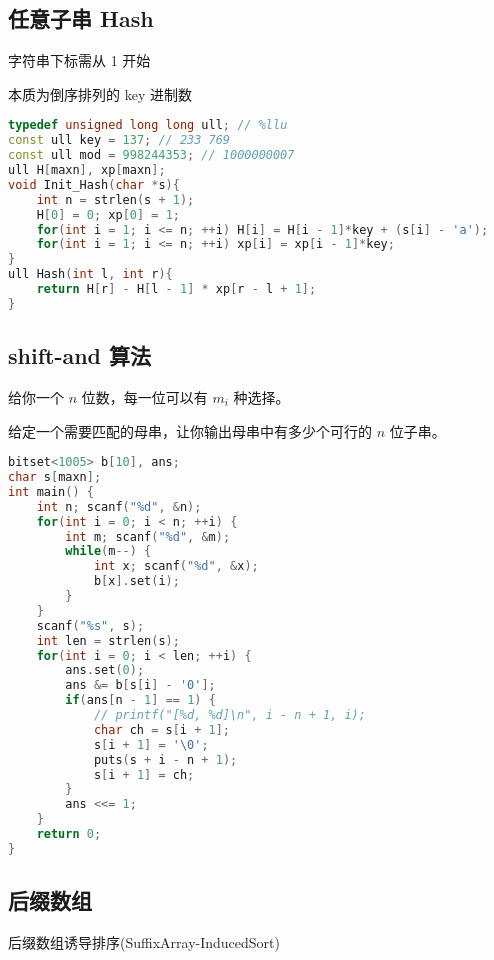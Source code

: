 \subsection{任意子串 Hash}

字符串下标需从 1 开始

本质为倒序排列的 key 进制数

\begin{lstlisting}[language=C++]
typedef unsigned long long ull; // %llu
const ull key = 137; // 233 769
const ull mod = 998244353; // 1000000007
ull H[maxn], xp[maxn];
void Init_Hash(char *s){
    int n = strlen(s + 1);
    H[0] = 0; xp[0] = 1;
    for(int i = 1; i <= n; ++i) H[i] = H[i - 1]*key + (s[i] - 'a');
    for(int i = 1; i <= n; ++i) xp[i] = xp[i - 1]*key;
}
ull Hash(int l, int r){
    return H[r] - H[l - 1] * xp[r - l + 1];
}
\end{lstlisting}

\subsection{shift-and 算法}

给你一个 $n$ 位数，每一位可以有 $m _ i$ 种选择。

给定一个需要匹配的母串，让你输出母串中有多少个可行的 $n$ 位子串。

\begin{lstlisting}[language=C++]
bitset<1005> b[10], ans;
char s[maxn];
int main() {
    int n; scanf("%d", &n);
    for(int i = 0; i < n; ++i) {
        int m; scanf("%d", &m);
        while(m--) {
            int x; scanf("%d", &x);
            b[x].set(i);
        }
    }
    scanf("%s", s);
    int len = strlen(s);
    for(int i = 0; i < len; ++i) {
        ans.set(0);
        ans &= b[s[i] - '0'];
        if(ans[n - 1] == 1) {
            // printf("[%d, %d]\n", i - n + 1, i);
            char ch = s[i + 1];
            s[i + 1] = '\0';
            puts(s + i - n + 1);
            s[i + 1] = ch;
        }
        ans <<= 1;
    }
    return 0;
}
\end{lstlisting}

\subsection{后缀数组}

后缀数组诱导排序(SuffixArray-InducedSort)

